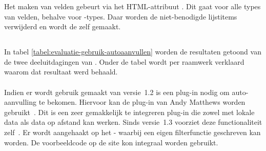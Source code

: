 Het  maken van velden gebeurt via het HTML-attribuut .
Dit gaat voor alle types van velden, behalve voor -types.
Daar worden de niet-benodigde lijstitems verwijderd en wordt de  zelf  gemaakt.


\subsection{}
\label{sec:evaluatie-gebruik-autoaanvullen}

In tabel \ref{tabel:evaluatie-gebruik-autoaanvullen} worden de resultaten getoond van de twee deeluitdagingen van .
Onder de tabel wordt per raamwerk verklaard waarom dat resultaat werd behaald.

\begin{table}[H]
\centering
{}
\caption{Gebruik voor }
\label{tabel:evaluatie-gebruik-autoaanvullen}
\end{table}

\paragraph{\jqm}
Indien er wordt gebruik gemaakt van versie~1.2 is een plug-in nodig om auto-aanvulling te bekomen.
Hiervoor kan de plug-in van Andy Matthews worden gebruikt~\cite{Matthews2013}. 
Dit is een zeer gemakkelijk te integreren plug-in die zowel met lokale data als data op afstand kan werken.
Sinds versie~1.3 voorziet \jqm{} deze functionaliteit zelf~\cite{JQuery2013c}.
Er wordt aangehaakt op het - waarbij een eigen filterfunctie geschreven kan worden.
De voorbeeldcode op de site kon integraal worden gebruikt. 

